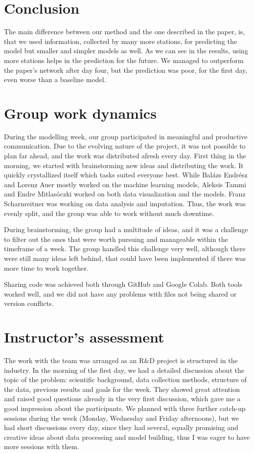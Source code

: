 \documentclass{article}
\begin{document}
\section{Conclusion}

The main difference between our method and the one described in the
paper{\cite{WaterLevel2023}}, is, that we used information, collected by many
more stations, for predicting the model but smaller and simpler models as
well. As we can see in the results, using more stations helps in the
prediction for the future. We managed to outperform the paper's network after
day four, but the prediction was poor, for the first day, even worse than a
baseline model.

\section{Group work dynamics}

During the modelling week, our group participated in meaningful and productive
communication. Due to the evolving nature of the project, it was not possible
to plan far ahead, and the work was distributed afresh every day. First thing
in the morning, we started with brainstorming new ideas and distributing the
work. It quickly crystallized itself which tasks suited everyone best. While
Bal{\'a}zs Endr{\'e}sz and Lorenz Auer mostly worked on the machine learning
models, Aleksis Tammi and Endre Mitlas{\'o}czki worked on both data
visualization and the models. Franz Scharnreitner was working on data analysis
and imputation. Thus, the work was evenly split, and the group was able to
work without much downtime.

During brainstorming, the group had a multitude of ideas, and it was a
challenge to filter out the ones that were worth pursuing and manageable
within the timeframe of a week. The group handled this challenge very well,
although there were still many ideas left behind, that could have been
implemented if there was more time to work together.

Sharing code was achieved both through GitHub and Google Colab. Both tools
worked well, and we did not have any problems with files not being shared or
version conflicts.

\section{Instructor's assessment}

The work with the team was arranged as an R$\&$D project is structured in the
industry. In the morning of the first day, we had a detailed discussion about
the topic of the problem: scientific background, data collection methods,
structure of the data, previous results and goals for the week. They showed
great attention and raised good questions already in the very first
discussion, which gave me a good impression about the participants. We planned
with three further catch-up sessions during the week (Monday, Wednesday and
Friday afternoons), but we had short discussions every day, since they had
several, equally promising and creative ideas about data processing and model
building, thus I was eager to have more sessions with them.
\end{document}
